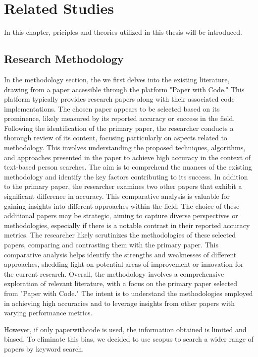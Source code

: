 \chapter{Related Studies }
In this chapter, priciples and theories utilized in this thesis will be introduced.


\section{Research Methodology}
In the methodology section, the we first delves into the existing literature, drawing from a paper accessible through the platform "Paper with Code." This platform typically provides research papers along with their associated code implementations. The chosen paper appears to be selected based on its prominence, likely measured by its reported accuracy or success in the field.
Following the identification of the primary paper, the researcher conducts a thorough review of its content, focusing particularly on aspects related to methodology. This involves understanding the proposed techniques, algorithms, and approaches presented in the paper to achieve high accuracy in the context of text-based person searches. The aim is to comprehend the nuances of the existing methodology and identify the key factors contributing to its success.
In addition to the primary paper, the researcher examines two other papers that exhibit a significant difference in accuracy. This comparative analysis is valuable for gaining insights into different approaches within the field. The choice of these additional papers may be strategic, aiming to capture diverse perspectives or methodologies, especially if there is a notable contrast in their reported accuracy metrics.
The researcher likely scrutinizes the methodologies of these selected papers, comparing and contrasting them with the primary paper. This comparative analysis helps identify the strengths and weaknesses of different approaches, shedding light on potential areas of improvement or innovation for the current research.
Overall, the methodology involves a comprehensive exploration of relevant literature, with a focus on the primary paper selected from "Paper with Code." The intent is to understand the methodologies employed in achieving high accuracies and to leverage insights from other papers with varying performance metrics. 

However, if only paperwithcode is used, the information obtained is limited and biased. To eliminate this bias, we decided to use scopus to search a wider range of papers by keyword search.


